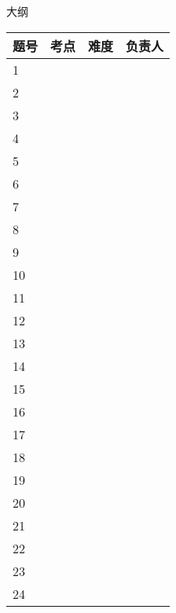 \documentclass[10pt]{article}
\begin{document}
\centerline{\Large 大纲}
\begin{table}[!htb]
    \centering
    \begin{tabularx}{0.8\textwidth}{p{}<{\centering}p{}<{\centering}p{}<{\centering}p{}<{\centering}} \toprule
        题号 & 考点 & 难度 & 负责人\\ \hline
        1 & & & \\ \hline
        2 & & & \\ \hline
        3 & & & \\ \hline
        4 & & & \\ \hline
        5 & & & \\ \hline
        6 & & & \\ \hline
        7 & & & \\ \hline
        8 & & & \\ \hline
        9 & & & \\ \hline
        10 & & & \\ \hline
        11 & & & \\ \hline
        12 & & & \\ \hline
        13 & & & \\ \hline
        14 & & & \\ \hline
        15 & & & \\ \hline
        16 & & & \\ \hline
        17 & & & \\ \hline
        18 & & & \\ \hline
        19 & & & \\ \hline
        20 & & & \\ \hline
        21 & & & \\ \hline
        22 & & & \\ \hline
        23 & & & \\ \hline
        24 & & & \\ \bottomrule
    \end{tabularx}
\end{table}
\end{document}
